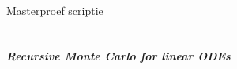 \begin{titlepage}
    \begin{center}
        \ \
        \ \\
        \ \\
        \ \\
        \ \\
        \ \\
        \ \\
        \ \\
        \ \\
        \ \\
        \ \\
        \ \\
        \Large{M{\sc asterproef scriptie}}
        \ \\
        \ \\
        \ \\
        \huge{\bf{\em Recursive Monte Carlo for linear ODEs}}
        \ \\
        \ \\
        \ \\
        \ \\

\end{center}
\end{titlepage}
